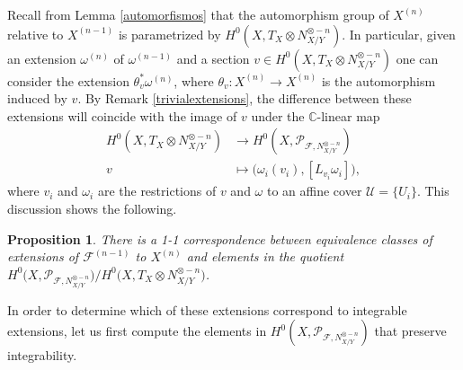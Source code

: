 \documentclass[reqno]{amsart}
\theoremstyle{plain}
\newcommand\C{\mathbb{C}}
\newcommand{\U}{\mathcal{U}}
\newcommand{\F}{\mathscr{F}}
\newcommand{\PP}{\mathcal{P}}
\newtheorem{proposition}[theorem]{Proposition}
\theoremstyle{definition}
\theoremstyle{named}
\begin{document}
Recall from Lemma \ref{automorfismos} that the automorphism group of $X^{(n)}$ relative to $X^{(n-1)}$ is parametrized by $H^0(X,T_X\otimes N_{X/Y}^{\otimes -n})$. In particular, given an extension $\omega^{(n)}$ of $\omega^{(n-1)}$ and a section $v\in H^0(X,T_X\otimes N_{X/Y}^{\otimes -n})$ one can consider the extension $\theta_v^* \omega^{(n)}$, where $\theta_v:X^{(n)}\to X^{(n)}$ is the automorphism induced by $v$. By Remark \ref{trivialextensions}, the difference between these extensions will coincide with the image of $v$ under the $\C$-linear map
\begin{align*}
    H^0(X,T_X\otimes N_{X/Y}^{\otimes -n})&\to H^0(X,\PP_{\F,N_{X/Y}^{\otimes - n}})\\
    v&\mapsto \big(\omega_i(v_i),[L_{v_i}\omega_i]\big),
\end{align*}
where $v_i$ and $\omega_i$ are the restrictions of $v$ and $\omega$ to an affine cover $\U = \{ U_i\}$.
This discussion shows the following.
\begin{proposition}
    There is a 1-1 correspondence between equivalence classes of extensions of $\F^{(n-1)}$ to $X^{(n)}$ and elements in the quotient
$H^0\big(X,\PP_{\F,N_{X/Y}^{\otimes - n}}\big)/H^0\big(X,T_X\otimes N_{X/Y}^{\otimes -n}\big)$.
\end{proposition}

In order to determine which of these extensions correspond to integrable extensions, let us first compute the elements in $H^0(X,\PP_{\F,N_{X/Y}^{\otimes - n}})$ that preserve integrability.
\end{document}
